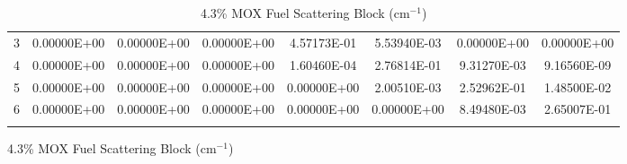 \begin{figure}
\begin{table}[H]
\begin{subtable}[h]{1.0\textwidth}
{\begin{tabular}{*8c}
3 & 0.00000E+00	 &	0.00000E+00 &	0.00000E+00 &	4.57173E-01 &	5.53940E-03 &	0.00000E+00 &	0.00000E+00 \\
4 & 0.00000E+00	 &	0.00000E+00 &	0.00000E+00 &	1.60460E-04 &	2.76814E-01 &	9.31270E-03 &	9.16560E-09 \\
5 & 0.00000E+00	 &	0.00000E+00 &	0.00000E+00 &	0.00000E+00 &	2.00510E-03 &	2.52962E-01 &	1.48500E-02 \\
6 & 0.00000E+00	 &	0.00000E+00 &	0.00000E+00 &	0.00000E+00 &	0.00000E+00 &	8.49480E-03 &	2.65007E-01 \\
        \bottomrule
        & & & & & & & 
    \end{tabular}}
        \caption{4.3\% MOX Fuel Scattering Block (cm$^{-1}$)}
  \end{subtable}
\end{table}
\end{figure}

